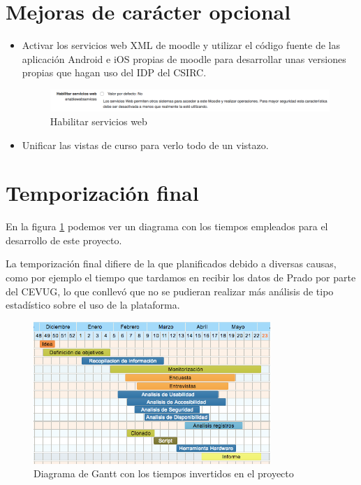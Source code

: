\section{Mejoras de carácter opcional}
\begin{itemize}
	\item Activar los servicios web XML de moodle y utilizar el código fuente de las aplicación Android e iOS propias de moodle para desarrollar unas versiones propias que hagan uso del IDP del CSIRC.
\begin{figure}[H]
\centering
\includegraphics[width=1.0\textwidth]{../screenshots/habilitar_serviciosweb}
\caption{Habilitar servicios web}
\end{figure}

	\item Unificar las vistas de curso para verlo todo de un vistazo.
	
\end{itemize}

\section{Temporización final}

En la figura \ref{fig:temporizacion2} podemos ver un diagrama con los tiempos empleados para el desarrollo de este proyecto. 

\bigskip
La temporización final difiere de la que planificados debido a diversas causas, como por ejemplo el tiempo que tardamos en recibir los datos de Prado por parte del CEVUG, lo que conllevó que no se pudieran realizar más análisis de tipo estadístico sobre el uso de la plataforma.

\begin{figure}[H]
\centering
\includegraphics[width=0.8\textwidth]{../screenshots/temporizacion2}
\caption{Diagrama de Gantt con los tiempos invertidos en el proyecto}
\label{fig:temporizacion2}
\end{figure}

